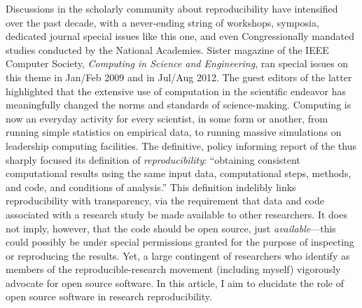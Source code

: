 \documentclass{statement}
\begin{document}
Discussions in the scholarly community about reproducibility have intensified over the past decade, with a never-ending string of workshops, symposia, dedicated journal special issues like this one, and even Congressionally mandated studies conducted by the National Academies. 
Sister magazine of the IEEE Computer Society, \emph{Computing in Science and Engineering}, ran special issues on this theme in Jan/Feb 2009 and in Jul/Aug 2012. 
The guest editors of the latter highlighted that the extensive use of computation in the scientific endeavor has meaningfully changed the norms and standards of science-making. 
Computing is now an everyday activity for every scientist, in some form or another, from running simple statistics on empirical data, to running massive simulations on leadership computing facilities. 
The definitive, policy informing report of the \cite{nasem_2019} thus sharply focused its definition of \emph{reproducibility}: 
``obtaining consistent computational results using the same input data, computational steps, methods, and code, and conditions of analysis.'' 
This definition indelibly links reproducibility with transparency, via the requirement that data and code associated with a research study be made available to other researchers. 
It does not imply, however, that the code should be open source, just \emph{available}---this could possibly be under special permissions granted for the purpose of inspecting or reproducing the results. 
Yet, a large contingent of researchers who identify as members of the reproducible-research movement (including myself) vigorously advocate for open source software. 
In this article, I aim to elucidate the role of open source software in research reproducibility.
\end{document}
